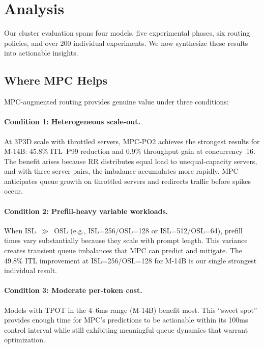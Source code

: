 \documentclass[runningheads]{llncs}
\begin{document}
\section{Analysis}
\label{sec:analysis}

Our cluster evaluation spans four models, five experimental phases, six routing policies, and over 200 individual experiments. We now synthesize these results into actionable insights.

\subsection{Where MPC Helps}

MPC-augmented routing provides genuine value under three conditions:

\paragraph{Condition 1: Heterogeneous scale-out.} At 3P3D scale with throttled servers, MPC-PO2 achieves the strongest results for M-14B: 45.8\% ITL~P99 reduction and 0.9\% throughput gain at concurrency~16. The benefit arises because RR distributes equal load to unequal-capacity servers, and with three server pairs, the imbalance accumulates more rapidly. MPC anticipates queue growth on throttled servers and redirects traffic before spikes occur.

\paragraph{Condition 2: Prefill-heavy variable workloads.} When ISL~$\gg$~OSL (e.g., ISL=256/OSL=128 or ISL=512/OSL=64), prefill times vary substantially because they scale with prompt length. This variance creates transient queue imbalances that MPC can predict and mitigate. The 49.8\% ITL improvement at ISL=256/OSL=128 for M-14B is our single strongest individual result.

\paragraph{Condition 3: Moderate per-token cost.} Models with TPOT in the 4--6ms range (M-14B) benefit most. This ``sweet spot'' provides enough time for MPC's predictions to be actionable within its 100ms control interval while still exhibiting meaningful queue dynamics that warrant optimization.
\end{document}
